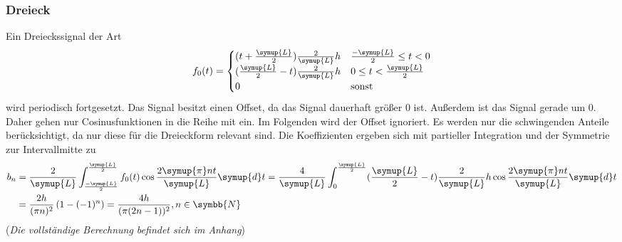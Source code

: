 \subsubsection{Dreieck}
Ein Dreieckssignal der Art
\begin{equation}
    f_0(t)=
    \begin{cases}
        (t+\frac{\symup{L}}{2})\frac{2}{\symup{L}}h & \frac{-\symup{L}}{2}\leq t < 0 \\
        (\frac{\symup{L}}{2}-t)\frac{2}{\symup{L}}h & 0 \leq t < \frac{\symup{L}}{2} \\
        0                                                   & \text{sonst}                   \\
    \end{cases}
    \label{eqn:Dreieck}
\end{equation}
wird periodisch fortgesetzt. Das Signal besitzt einen Offset, da das Signal dauerhaft
größer 0 ist. Außerdem ist das Signal gerade um 0. Daher gehen nur Cosinusfunktionen
in die Reihe mit ein. Im Folgenden wird der Offset ignoriert. Es werden nur die schwingenden Anteile
berücksichtigt, da nur diese für die Dreieckform relevant sind. Die Koeffizienten ergeben
sich mit partieller Integration und der Symmetrie zur Intervallmitte zu
\begin{equation}
    \begin{split}
        b_n&=\frac{2}{\symup{L}}\int_{\frac{-\symup{L}}{2}}^{\frac{\symup{L}}{2}}f_0(t)\cos{\frac{2\symup{\pi}nt}{\symup{L}}}\symup{d}t
        =\frac{4}{\symup{L}}\int_0^{\frac{\symup{L}}{2}}(\frac{\symup{L}}{2}-t)\frac{2}{\symup{L}}h\cos{\frac{2\symup{\pi}nt}{\symup{L}}}\symup{d}t\\
        &=\frac{2h}{(\pi n)^2}\left(1-(-1)^n\right)
        =\frac{4h}{(\pi(2n-1))^2}  , n\in \symbb{N}
    \end{split}
    \label{eqn:Dreieck-Koeff}
\end{equation}
(\textit{Die vollständige Berechnung befindet sich im Anhang})


